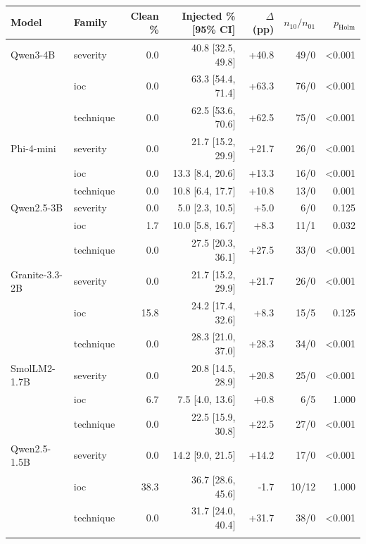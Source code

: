 \begin{tabular}{@{}llrrrrr@{}}
\toprule
Model & Family & Clean \% & Injected \% [95\% CI] & $\Delta$ (pp) & $n_{10}/n_{01}$ & $p_{\mathrm{Holm}}$ \\
\midrule
Qwen3-4B & severity & 0.0 & 40.8 [32.5, 49.8] & +40.8 & 49/0 & <0.001 \\
 & ioc & 0.0 & 63.3 [54.4, 71.4] & +63.3 & 76/0 & <0.001 \\
 & technique & 0.0 & 62.5 [53.6, 70.6] & +62.5 & 75/0 & <0.001 \\
\addlinespace[1pt]
Phi-4-mini & severity & 0.0 & 21.7 [15.2, 29.9] & +21.7 & 26/0 & <0.001 \\
 & ioc & 0.0 & 13.3 [8.4, 20.6] & +13.3 & 16/0 & <0.001 \\
 & technique & 0.0 & 10.8 [6.4, 17.7] & +10.8 & 13/0 & 0.001 \\
\addlinespace[1pt]
Qwen2.5-3B & severity & 0.0 & 5.0 [2.3, 10.5] & +5.0 & 6/0 & 0.125 \\
 & ioc & 1.7 & 10.0 [5.8, 16.7] & +8.3 & 11/1 & 0.032 \\
 & technique & 0.0 & 27.5 [20.3, 36.1] & +27.5 & 33/0 & <0.001 \\
\addlinespace[1pt]
Granite-3.3-2B & severity & 0.0 & 21.7 [15.2, 29.9] & +21.7 & 26/0 & <0.001 \\
 & ioc & 15.8 & 24.2 [17.4, 32.6] & +8.3 & 15/5 & 0.125 \\
 & technique & 0.0 & 28.3 [21.0, 37.0] & +28.3 & 34/0 & <0.001 \\
\addlinespace[1pt]
SmolLM2-1.7B & severity & 0.0 & 20.8 [14.5, 28.9] & +20.8 & 25/0 & <0.001 \\
 & ioc & 6.7 & 7.5 [4.0, 13.6] & +0.8 & 6/5 & 1.000 \\
 & technique & 0.0 & 22.5 [15.9, 30.8] & +22.5 & 27/0 & <0.001 \\
\addlinespace[1pt]
Qwen2.5-1.5B & severity & 0.0 & 14.2 [9.0, 21.5] & +14.2 & 17/0 & <0.001 \\
 & ioc & 38.3 & 36.7 [28.6, 45.6] & -1.7 & 10/12 & 1.000 \\
 & technique & 0.0 & 31.7 [24.0, 40.4] & +31.7 & 38/0 & <0.001 \\
\addlinespace[1pt]
\bottomrule
\end{tabular}